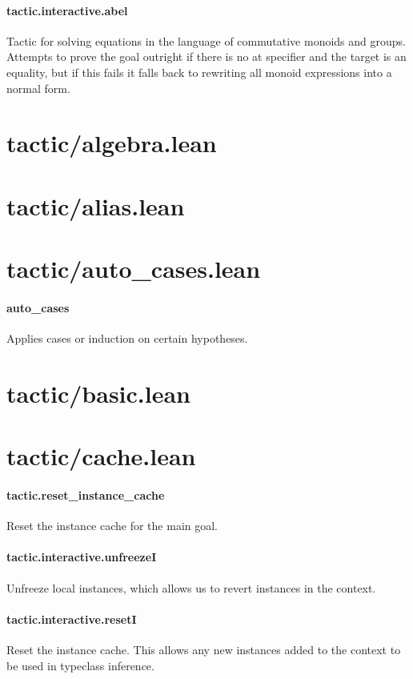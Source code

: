 \documentclass{article}
\begin{document}
\paragraph{tactic.interactive.abel}
\par
Tactic for solving equations in the language of
commutative monoids and groups.
Attempts to prove the goal outright if there is no 
\colorbox[RGB]{253,246,227}{{{{\color[RGB]{133, 153, 0} at }}}}specifier and the target is an equality, but if this
fails it falls back to rewriting all monoid expressions
into a normal form.
\section{tactic/algebra.lean}\section{tactic/alias.lean}\section{tactic/auto\_cases.lean}\paragraph{auto\_cases}
\par
Applies 
\colorbox[RGB]{253,246,227}{{{{\color[RGB]{101, 123, 131} cases }}}} or 
\colorbox[RGB]{253,246,227}{{{{\color[RGB]{101, 123, 131} induction }}}} on certain hypotheses.
\section{tactic/basic.lean}\section{tactic/cache.lean}\paragraph{tactic.reset\_instance\_cache}
\par
Reset the instance cache for the main goal.
\paragraph{tactic.interactive.unfreezeI}
\par
Unfreeze local instances, which allows us to revert
instances in the context.
\paragraph{tactic.interactive.resetI}
\par
Reset the instance cache. This allows any new instances
added to the context to be used in typeclass inference.
\end{document}
